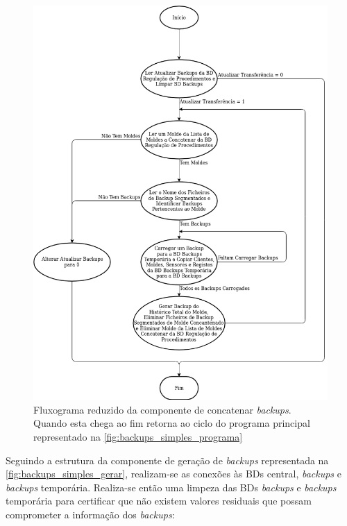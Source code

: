 \documentclass[11pt,twoside,a4paper]{report}
\begin{document}
\begin{figure}
	\begin{center}
		\includegraphics[width=1\textwidth]{fluxograma_simples_backups_concatenar01} %
		\caption[Fluxograma reduzido da componente de concatenar \textit{backups}]{Fluxograma reduzido da componente de concatenar \textit{backups}. Quando esta chega ao fim retorna ao ciclo do programa principal representado na \autoref{fig:backups_simples_programa}}
		\label{fig:backups_simples_concatenar}
	\end{center}
\end{figure}
\newpage
Seguindo a estrutura da componente de geração de \textit{backups} representada na \autoref{fig:backups_simples_gerar}, realizam-se as conexões às BDs central, \textit{backups} e \textit{backups} temporária. Realiza-se então uma limpeza das BDs \textit{backups} e \textit{backups} temporária para certificar que não existem valores residuais que possam comprometer a informação dos \textit{backups}:
\end{document}
